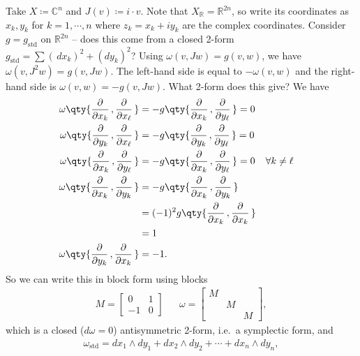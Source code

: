 \begin{example}[?]

Take \(X \coloneqq{\mathbb{C}}^n\) and \(J(v) \coloneqq i\cdot v\). Note
that \(X_{\mathbb{R}}= {\mathbb{R}}^{2n}\), so write its coordinates as
\(x_k, y_k\) for \(k = 1, \cdots, n\) where \(z_k = x_k + iy_k\) are the
complex coordinates. Consider \(g = g_\text{std}\) on
\({\mathbb{R}}^{2n}\) -- does this come from a closed 2-form
\(g_\text{std}= \sum (\,dx_k)^2 + (dy_k)^2\)? Using
\(\omega(v, Jw) = g(v, w)\), we have \(\omega(v, J^2 w) = g(v, Jw)\).
The left-hand side is equal to \(- \omega(v, w)\) and the right-hand
side is \(\omega(v, w) = -g(v, Jw)\). What 2-form does this give? We
have
\begin{align*}
\omega\qty{ {\frac{\partial }{\partial x_k}\,}, {\frac{\partial }{\partial x_\ell}\,} } 
&= -g \qty{ {\frac{\partial }{\partial x_k}\,}, {\frac{\partial }{\partial y_\ell}\,} } = 0 \\
\omega\qty{ {\frac{\partial }{\partial y_k}\,}, {\frac{\partial }{\partial x_\ell}\,} } 
&= -g \qty{ {\frac{\partial }{\partial y_k}\,}, {\frac{\partial }{\partial y_\ell}\,} } = 0 \\
\omega\qty{ {\frac{\partial }{\partial x_k}\,}, {\frac{\partial }{\partial y_\ell}\,} } 
&= -g \qty{ {\frac{\partial }{\partial x_k}\,}, {\frac{\partial }{\partial y_\ell}\,} } = 0 && \forall k\neq \ell \\
\omega\qty{ {\frac{\partial }{\partial x_k}\,}, {\frac{\partial }{\partial y_k}\,} } 
&= -g \qty{ {\frac{\partial }{\partial x_k}\,}, {\frac{\partial }{\partial y_k}\,} } \\
&= (-1)^2 g \qty{ {\frac{\partial }{\partial x_k}\,} , {\frac{\partial }{\partial x_k}\,} } \\
&= 1 \\
\omega\qty{ {\frac{\partial }{\partial y_k}\,}, {\frac{\partial }{\partial x_k}\,} } 
&= -1
.\end{align*}
So we can write this in block form using blocks
\begin{align*}
M = 
\begin{bmatrix}
0 & 1 
\\
-1 & 0
\end{bmatrix} &&
\omega =
\begin{bmatrix}
M &  & 
\\
 & M & 
\\
 &  & M
\end{bmatrix}
,\end{align*}
which is a closed (\(d\omega = 0\)) antisymmetric 2-form, i.e.~a
symplectic form, and
\begin{align*}
\omega_\text{std}= dx_1 \wedge dy_1 + dx_2 \wedge dy_2 + \cdots + dx_n \wedge dy_n
,\end{align*}

\end{example}

